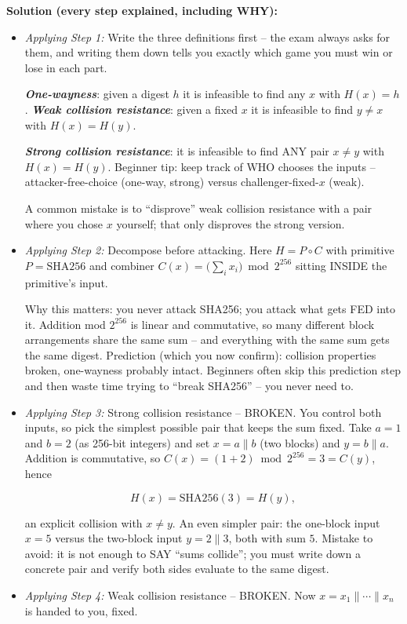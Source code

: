 \documentclass[12pt, a4paper]{article}
\newcommand{\term}[1]{\textbf{\textit{#1}}}        %
\begin{document}
\textbf{Solution (every step explained, including WHY):}
\begin{itemize}
    \item \textit{Applying Step 1:} Write the three definitions first -- the exam always asks for them, and writing them down tells you exactly which game you must win or lose in each part.

    \term{One-wayness}: given a digest $h$ it is infeasible to find any $x$ with $H(x) = h$. \term{Weak collision resistance}: given a fixed $x$ it is infeasible to find $y \neq x$ with $H(x) = H(y)$.

    \term{Strong collision resistance}: it is infeasible to find ANY pair $x \neq y$ with $H(x) = H(y)$. Beginner tip: keep track of WHO chooses the inputs -- attacker-free-choice (one-way, strong) versus challenger-fixed-$x$ (weak).

    A common mistake is to ``disprove'' weak collision resistance with a pair where you chose $x$ yourself; that only disproves the strong version.
    \item \textit{Applying Step 2:} Decompose before attacking. Here $H = P \circ C$ with primitive $P = \mathrm{SHA256}$ and combiner $C(x) = \big(\sum_i x_i\big) \bmod 2^{256}$ sitting INSIDE the primitive's input.

    Why this matters: you never attack SHA256; you attack what gets FED into it. Addition mod $2^{256}$ is linear and commutative, so many different block arrangements share the same sum -- and everything with the same sum gets the same digest.
    Prediction (which you now confirm): collision properties broken, one-wayness probably intact. Beginners often skip this prediction step and then waste time trying to ``break SHA256'' -- you never need to.
    \item \textit{Applying Step 3:} Strong collision resistance -- BROKEN. You control both inputs, so pick the simplest possible pair that keeps the sum fixed. Take $a = 1$ and $b = 2$ (as 256-bit integers) and set $x = a \| b$ (two blocks) and $y = b \| a$. Addition is commutative, so $C(x) = (1+2) \bmod 2^{256} = 3 = C(y)$, hence

\[
H(x) = \mathrm{SHA256}(3) = H(y),
\]

an explicit collision with $x \neq y$. An even simpler pair: the one-block input $x = 5$ versus the two-block input $y = 2 \| 3$, both with sum $5$. Mistake to avoid: it is not enough to SAY ``sums collide''; you must write down a concrete pair and verify both sides evaluate to the same digest.
    \item \textit{Applying Step 4:} Weak collision resistance -- BROKEN. Now $x = x_1 \| \cdots \| x_n$ is handed to you, fixed.


\end{itemize}
\end{document}
